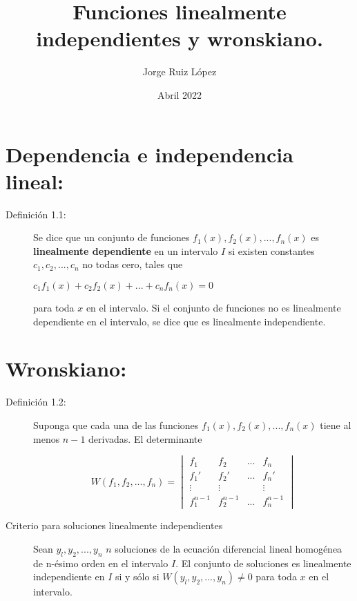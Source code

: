 \documentclass{article}
\title{Funciones linealmente independientes y wronskiano.}
\author{Jorge Ruiz López}
\affil{Facultad de Ingeniería UNAM}
\date{Abril 2022}
\begin{document}
\maketitle
\section{Dependencia e independencia lineal:}
\begin{description}
\item[Definición 1.1:]Se dice que un conjunto de funciones $f_1(x), f_2(x),..., f_n(x)$ es \textbf{linealmente dependiente} en un intervalo $I$ si existen constantes $c_1, c_2,...,c_n$ no todas cero, tales que
\begin{center}
    $c_1f_1(x)+ c_2f_2(x)+...+c_nf_n(x) = 0$
\end{center}
para toda $x$ en el intervalo. Si el conjunto de funciones no es linealmente dependiente en el intervalo, se dice que es linealmente independiente.
\end{description}
\section{Wronskiano:}
\begin{description}
\item[Definición 1.2:]Suponga que cada una de las funciones $f_1(x), f_2(x), . . . , f_n(x)$ tiene al menos $n-1$ derivadas. El determinante
\begin{center}
\begin{equation}W(f_1, f_2, ...,f_n)= \begin{vmatrix}
f_1 & f_2 & ... & f_n\\
f_1' & f_2' & ... & f_n'\\
\vdots & \vdots & & \vdots\\
f_1^{n-1} & f_2^{n-1} & ... & f_n^{n-1} 
\end{vmatrix}
\end{equation}
\end{center}
\item[Criterio para soluciones linealmente independientes]Sean $y_l, y_2, . . . , y_n$ $n$ soluciones de la ecuación diferencial lineal homogénea de n-ésimo orden en el intervalo $I$. El conjunto de soluciones es linealmente independiente en $I$ si y sólo si $W(y_l, y_2, . . . ,y_n)\neq 0$   para toda $x$ en el intervalo.
\end{description}
\end{document}
